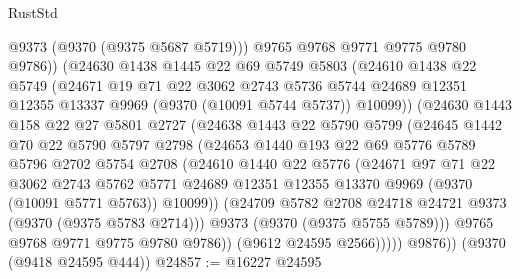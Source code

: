 \begin{lexlean}{RustStd}
\begin{coremodule}
                  @9373
                  (@9370 (@9375 @5687 @5719)))
                @9765
                @9768
                @9771
                @9775
                @9780
                @9786))
            (@24630
              @1438
              @1445
              @22
              @69
              @5749
              @5803
              (@24610
                @1438
                @22
                @5749
                (@24671
                  @19
                  @71
                  @22
                  @3062
                  @2743
                  @5736
                  @5744
                  @24689
                  @12351
                  @12355
                  @13337
                  @9969
                  (@9370 (@10091 @5744 @5737))
                  @10099))
              (@24630
                @1443
                @158
                @22
                @27
                @5801
                @2727
                (@24638
                  @1443
                  @22
                  @5790
                  @5799
                  (@24645
                    @1442
                    @70
                    @22
                    @5790
                    @5797
                    @2798
                    (@24653
                      @1440
                      @193
                      @22
                      @69
                      @5776
                      @5789
                      @5796
                      @2702
                      @5754
                      @2708
                      (@24610
                        @1440
                        @22
                        @5776
                        (@24671
                          @97
                          @71
                          @22
                          @3062
                          @2743
                          @5762
                          @5771
                          @24689
                          @12351
                          @12355
                          @13370
                          @9969
                          (@9370 (@10091 @5771 @5763))
                          @10099))
                      (@24709 @5782 @2708 @24718 @24721 @9373 (@9370 (@9375 @5783 @2714)))
                      @9373
                      (@9370 (@9375 @5755 @5789)))
                    @9765
                    @9768
                    @9771
                    @9775
                    @9780
                    @9786))
                (@9612 @24595 @2566)))))
        @9876))
    (@9370 (@9418 @24595 @444))
@24857 := @16227 @24595

\end{coremodule}
\end{lexlean}
